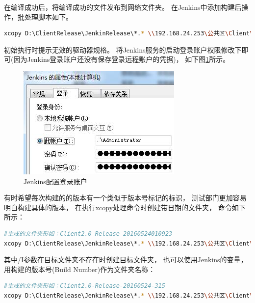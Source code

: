 \documentclass{book}
\begin{document}
在编译成功后，将编译成功的文件发布到网络文件夹。
在Jenkins中添加构建后操作，批处理脚本如下。

\begin{lstlisting}[language=Bash]
xcopy D:\ClientRelease\JenkinRelease\*.* \\192.168.24.253\公共区\Client\2.0\Release /S /R /Y
\end{lstlisting}

初始执行时提示无效的驱动器规格。
将Jenkins服务的启动登录账户权限修改下即可(因为Jenkins登录账户还没有保存登录远程账户的凭据)，
如下图\ref{fig:JenkinsChangeLoginAccount}所示。

\begin{figure}[htbp]
	\centering
	\includegraphics[scale=0.8]{JenkinsChangeLoginAccount.jpg}
	\caption{Jenkins配置登录账户}
	\label{fig:JenkinsChangeLoginAccount}
\end{figure}

有时希望每次构建的的版本有一个类似于版本号标记的标识，
测试部门更加容易明白构建具体的版本，
在执行xcopy处理命令时创建带日期的文件夹，
命令如下所示：

\begin{lstlisting}[language=Bash]
#生成的文件夹形如：Client2.0-Release-20160524010923
xcopy D:\ClientRelease\JenkinRelease\*.* \\192.168.24.253\公共区\Client\2.0\Client2.0-Release-%date:~0,4%%date:~5,2%%date:~8,2%0%time:~1,1%%time:~3,2%%time:~6,2% /S /R /Y /I
\end{lstlisting}

其中/I参数在目标文件夹不存在时创建目标文件夹，
也可以使用Jenkins的变量，用构建的版本号(Build Number)作为文件夹名称：

\begin{lstlisting}[language=Bash]
#生成的文件夹形如：Client2.0-Release-20160524-315
xcopy D:\ClientRelease\JenkinRelease\*.* \\192.168.24.253\公共区\Client\2.0\Client2.0-Release-%date:~0,4%%date:~5,2%%date:~8,2%-%BUILD_NUMBER% /S /R /Y /I
\end{lstlisting}
\end{document}
